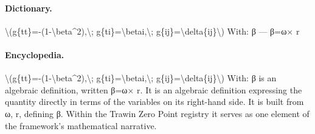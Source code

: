 \paragraph{Dictionary.}
\textbackslash{}(g\{tt\}=-(1-\textbackslash{}beta\textasciicircum{}2),\textbackslash{}; g\{ti\}=\textbackslash{}betai,\textbackslash{}; g\{ij\}=\textbackslash{}delta\{ij\}\textbackslash{}) With: β — β=ω× r

\paragraph{Encyclopedia.}
\textbackslash{}(g\{tt\}=-(1-\textbackslash{}beta\textasciicircum{}2),\textbackslash{}; g\{ti\}=\textbackslash{}betai,\textbackslash{}; g\{ij\}=\textbackslash{}delta\{ij\}\textbackslash{}) With: β is an algebraic definition, written β=ω× r. It is an algebraic definition expressing the quantity directly in terms of the variables on its right-hand side. It is built from ω, r, defining β. Within the Trawin Zero Point registry it serves as one element of the framework's mathematical narrative.
